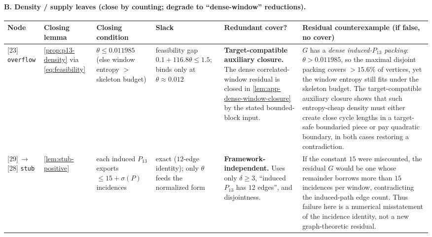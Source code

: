 \documentclass[11pt]{article}
\begin{document}
\paragraph{B. Density / supply leaves (close by counting; degrade to ``dense-window'' reductions).}
{\scriptsize\setlength{\tabcolsep}{3pt}
\begin{longtable}{L{0.09\textwidth} L{0.095\textwidth} L{0.15\textwidth} L{0.08\textwidth} L{0.105\textwidth} L{0.335\textwidth}}
\toprule
\textbf{Node} & \textbf{Closing lemma} & \textbf{Closing condition} & \textbf{Slack} & \textbf{Redundant cover?} & \textbf{Residual counterexample (if false, no cover)} \\
\midrule
\endhead
{[23]} \texttt{overflow} & \cref{prop:p13-density} via \cref{eq:feasibility} & $\theta\le0.011985$ (else window entropy $>$ skeleton budget) & feasibility gap $0.1+116.8\theta\le1.5$; binds only at $\theta\approx0.012$ & \textbf{Target-compatible auxiliary closure.} The dense correlated-window residual is closed in \cref{lem:app-dense-window-closure} by the stated bounded-block input. & $G$ has a \emph{dense induced-$P_{13}$ packing}: $\theta>0.011985$, so the maximal disjoint packing covers $>15.6\%$ of vertices, yet the window entropy still fits under the skeleton budget. The target-compatible auxiliary closure shows that such entropy-cheap density must either create close cycle lengths in a target-safe boundaried piece or pay quadratic boundary, in both cases restoring a contradiction. \\
{[29]}\,$\to$\,{[28]} \texttt{stub} & \cref{lem:stub-positive} & each induced $P_{13}$ exports $\le15+\sigma(P)$ incidences & exact ($12$-edge identity); only $\theta$ feeds the normalized form & \textbf{Framework-independent.} Uses only $\delta\ge3$, ``induced $P_{13}$ has $12$ edges'', and disjointness. & If the constant $15$ were miscounted, the residual $G$ would be one whose remainder borrows more than $15$ incidences per window, contradicting the induced-path edge count. Thus failure here is a numerical misstatement of the incidence identity, not a new graph-theoretic residual. \\
\bottomrule
\end{longtable}
}
\end{document}
